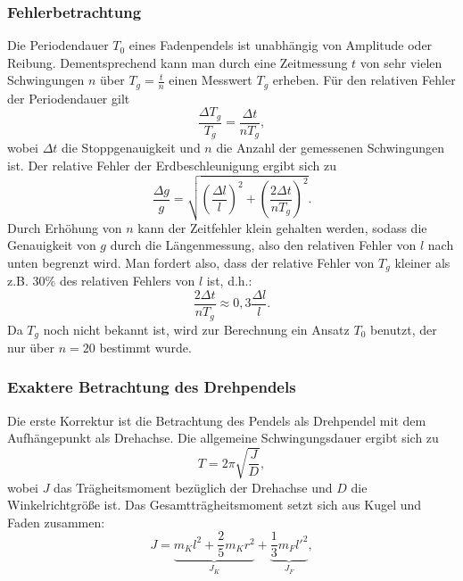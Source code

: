 \subsubsection{Fehlerbetrachtung}
Die Periodendauer \(T_0\) eines Fadenpendels ist unabhängig von Amplitude oder Reibung. Dementsprechend kann man durch eine Zeitmessung \(t\) von sehr vielen Schwingungen \(n\) über \(T_g=\frac{t}{n}\) einen Messwert \(T_g\) erheben.
Für den relativen Fehler der Periodendauer gilt
\begin{equation}
    \frac{\Delta T_g}{T_g} = \frac{\Delta t}{n T_g},
    \label{eq:fehler_T}
\end{equation}
wobei \(\Delta t\) die Stoppgenauigkeit und \(n\) die Anzahl der gemessenen Schwingungen ist. Der relative Fehler der Erdbeschleunigung ergibt sich zu
\begin{equation}
    \frac{\Delta g}{g} = \sqrt{\left(\frac{\Delta l}{l}\right)^2 + \left(\frac{2\Delta t}{nT_g}\right)^2}.
    \label{eq:fehler_g}
\end{equation}
Durch Erhöhung von \(n\) kann der Zeitfehler klein gehalten werden, sodass die Genauigkeit von \(g\) durch die Längenmessung, also den relativen Fehler von \(l\) nach unten begrenzt wird. Man fordert also, dass der relative Fehler von \(T_g\) kleiner als z.B. 30\% des relativen Fehlers von \(l\) ist, d.h.:
\begin{equation}
    \frac{2 \Delta t}{n T_g} \approx 0{,}3 \frac{\Delta l}{l}.
    \label{eq:bedingung_n}
\end{equation}
Da \(T_g\) noch nicht bekannt ist, wird zur Berechnung ein Ansatz \(T_0\) benutzt, der nur über \(n=20\) bestimmt wurde.

\subsubsection{Exaktere Betrachtung des Drehpendels}
Die erste Korrektur ist die Betrachtung des Pendels als Drehpendel mit dem Aufhängepunkt als Drehachse. Die allgemeine Schwingungsdauer ergibt sich zu
\begin{equation}
    T = 2\pi \sqrt{\frac{J}{D}},
    \label{eq:T_drehpendel}
\end{equation}
wobei \(J\) das Trägheitsmoment bezüglich der Drehachse und \(D\) die Winkelrichtgröße ist. Das Gesamtträgheitsmoment setzt sich aus Kugel und Faden zusammen:
\begin{equation}
    J = \underbrace{m_K l^2 + \frac{2}{5} m_K r^2}_{J_K} 
      + \underbrace{\frac{1}{3} m_F l'^2}_{J_F},
    \label{eq:J}
\end{equation}

